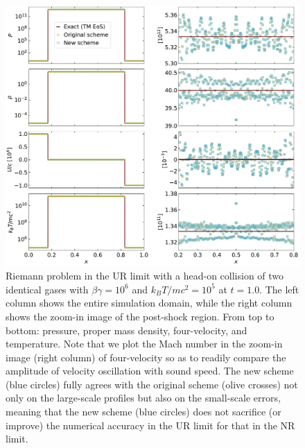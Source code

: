 \begin{figure}
\includegraphics[width=\linewidth]{srhd-figures/HeadCollision.pdf}
\caption{Riemann problem in the UR limit with a head-on collision of two identical gases with $\beta\gamma=10^{6}$ and $k_{B}T/mc^2=10^{5}$ at $t=1.0$. The left column shows the entire simulation domain, while the right column shows the zoom-in image of the post-shock region. From top to bottom: pressure, proper mass density, four-velocity, and temperature. Note that we plot the Mach number in the zoom-in image (right column) of four-velocity so as to readily compare the amplitude of velocity oscillation with sound speed. The new scheme (blue circles) fully agrees with the original scheme (olive crosses) not only on the large-scale profiles but also on the small-scale errors, meaning that the new scheme (blue circles) does not sacrifice (or improve) the numerical accuracy in the UR limit for  that in the NR limit.}
\label{fig:head-on collision shock tube}
\end{figure}


